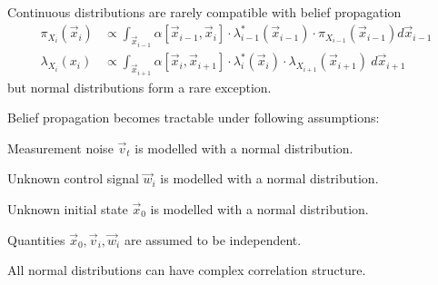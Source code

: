 \documentclass[landscape,footrule]{foils}
\begin{document}


Continuous distributions are rarely compatible with belief propagation
\begin{align*}
\pi_{X_i}(\vec{x}_i)
&\propto \int_{\vec{x}_{i-1}} \alpha[\vec{x}_{i-1}, \vec{x}_i]\cdot\lambda_{i-1}^*(\vec{x}_{i-1})\cdot \pi_{X_{i-1}}(\vec{x}_{i-1})d\vec{x}_{i-1}\\
\lambda_{X_i}(x_i)
&\propto \int_{\vec{x}_{i+1}} \alpha[\vec{x}_{i}, \vec{x}_{i+1}]\cdot\lambda_{i}^*(\vec{x}_{i})\cdot\lambda_{X_{i+1}}(\vec{x}_{i+1})\ d\vec{x}_{i+1}
\end{align*}
but normal distributions form a rare exception.
 




Belief propagation becomes tractable under following assumptions:
\begin{triangles}
\item Measurement noise $\vec{v}_t$ is modelled with a normal distribution.
\item Unknown control signal $\vec{w}_i$ is modelled with a normal distribution.
\item Unknown initial state $\vec{x}_0$ is modelled with a normal distribution.
\item Quantities $\vec{x}_0, \vec{v}_i, \vec{w}_i$ are assumed to be independent.
\item All normal distributions can have complex correlation structure.
\end{triangles}



\end{document}

